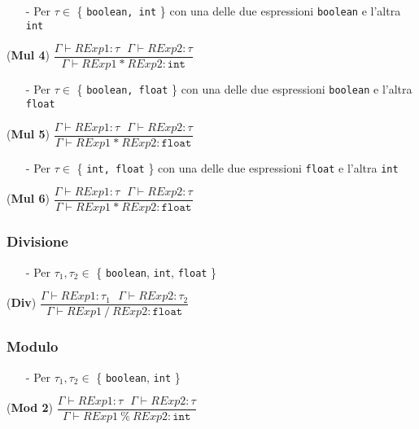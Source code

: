 \documentclass[12pt]{article}
\begin{document}
\begin{center}
\begin{itemize}
\item[-] Per $\tau \in$ \{ \texttt{boolean, int} \} con una delle due espressioni \texttt{boolean} e l'altra \texttt{int}
\end{itemize}
\noindent(\textbf{Mul 4})
$\dfrac{\Gamma \vdash RExp1:\tau\ \ \ \Gamma \vdash RExp2:\tau}{\Gamma \vdash RExp1\ \texttt{*}\ RExp2:\texttt{int}}$\\[0.1in]
\begin{itemize}
\item[-] Per $\tau \in$ \{ \texttt{boolean, float} \} con una delle due espressioni \texttt{boolean} e l'altra \texttt{float}
\end{itemize}

\noindent(\textbf{Mul 5})
$\dfrac{\Gamma \vdash RExp1:\tau\ \ \ \Gamma \vdash RExp2:\tau}{\Gamma \vdash RExp1\ \texttt{*}\ RExp2:\texttt{float}}$\\[0.1in]
\begin{itemize}
\item[-] Per $\tau \in$ \{ \texttt{int, float} \} con una delle due espressioni \texttt{float} e l'altra \texttt{int}
\end{itemize}
\noindent(\textbf{Mul 6})
$\dfrac{\Gamma \vdash RExp1:\tau\ \ \ \Gamma \vdash RExp2:\tau}{\Gamma \vdash RExp1\ \texttt{*}\ RExp2:\texttt{float}}$\\[0.1in]
\end{center}

\subsubsection*{Divisione}
\begin{center}

\begin{itemize}
\item[-] Per $\tau_1,\tau_2 \in$ \{ \texttt{boolean}, \texttt{int}, \texttt{float} \}
\end{itemize}
\noindent(\textbf{Div})
$\dfrac{\Gamma \vdash RExp1:\tau_1\ \ \ \Gamma \vdash RExp2:\tau_2}{\Gamma \vdash RExp1\ \texttt{/}\ RExp2:\texttt{float}}$\\[0.1in]

\end{center}

\subsubsection*{Modulo}
\begin{center}
\begin{itemize}
\item[-] Per $\tau_1,\tau_2 \in$ \{ \texttt{boolean}, \texttt{int} \}
\end{itemize}
\noindent(\textbf{Mod 2})
$\dfrac{\Gamma \vdash RExp1:\tau\ \ \ \Gamma \vdash RExp2:\tau}{\Gamma \vdash RExp1\ \texttt{\%}\ RExp2:\texttt{int}}$
\end{center}
\end{document}
